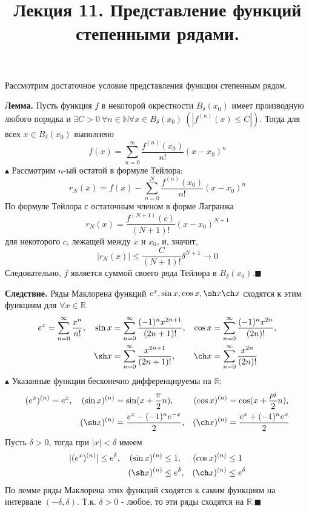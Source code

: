 \documentclass{article}
\date{}
\begin{document}
\title{Лекция 11. Представление функций степенными рядами.}
\maketitle

Рассмотрим достаточное условие представления функции степенным рядом.

\textbf{Лемма.} Пусть функция $f$ в некоторой окрестности $B_{\delta}(x_0)$ имеет производную любого порядка и $\exists C>0 \: \forall n \in \mathbb{N} \forall x \in B_{\delta}(x_0) \: \left(|f^{(n)}(x)\leq C|\right)$. Тогда для всех $x \in B_{\delta}(x_0)$ выполнено
$$f(x)=\sum_{n=0}^{\infty}\frac{f^{(n)}(x_0)}{n!}(x-x_0)^n$$
$\blacktriangle$ Рассмотрим $n$-ый остатой в формуле Тейлора: $$r_{N}(x)=f(x) - \sum_{n=0}^{N}\frac{f^{(n)}(x_0)}{n!}(x-x_0)^n$$
По формуле Тейлора с остаточным членом в форме Лагранжа
$$r_{N}(x)=\frac{f^{(N+1)}(c)}{(N+1)!}(x-x_0)^{N+1}$$ для некоторого $c$, лежащей между $x$ и $x_0$, и, значит,
$$|r_N(x)|\leq\frac{C}{(N+1)!}\delta^{N+1}\to0$$
Следовательно, $f$ является суммой своего ряда Тейлора в $B_{\delta}(x_0)$.\:$\blacksquare$

\textbf{Следствие.} Ряды Маклорена функций $e^x, \sin x, \cos x, \sh x \ch x$ сходятся к этим функциям для $\forall x \in \mathbb{R}$.
\begin{align*}
e^{x}=\sum_{n=0}^{\infty}\frac{x^n}{n!}, \quad \sin x&= \sum_{n=0}^{\infty}\frac{(-1)^{n}x^{2n+1}}{(2n+1)!}, & \cos x&= \sum_{n=0}^{\infty}\frac{(-1)^{n}x^{2n}}{(2n)!},\\
                                               \sh  x&= \sum_{n=0}^{\infty}\frac{x^{2n+1}}{(2n+1)!},         &  \ch x&= \sum_{n=0}^{\infty}\frac{x^{2n}}{(2n)!}
\end{align*}
$\blacktriangle$
Указанные функции бесконечно дифференцируемы на $\mathbb{R}$:
\begin{align*}
(e^x)^{(n)}=e^x, \quad (\sin x)^{(n)}&=\sin (x+\frac{\pi}{2}n),      & (\cos x)^{(n)}&=\cos (x + \frac{pi}{2}n),\\
                        (\sh x)^{(n)}&=\frac{e^x-(-1)^{n}e^{-x}}{2}, & (\ch x) ^{(n)}&=\frac{e^x+(-1)^n e^x}{2}
\end{align*}
Пусть $\delta > 0$, тогда при $|x|<\delta$ имеем
\begin{align*}
|(e^x)^{(n)}|\leq e^\delta, \quad (\sin x)^{(n)} &\leq 1,        &(\cos x)^{(n)}   &\leq 1\\
                                   (\sh x)^{(n)} &\leq e^\delta, &(\ch x)^{(n)}    &\leq e^\delta
\end{align*}
По лемме ряды Маклорена этих функций сходятся к самим функциям на интервале $(-\delta, \delta)$. Т.к. $\delta>0$ - любое, то эти ряды сходятся на $\mathbb{R}$.\:$\blacksquare$
\end{document}
